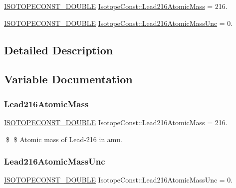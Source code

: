 \begin{DoxyCompactItemize}
\item 
\mbox{\hyperlink{group___isotope_const-_macros_ga8f45a7272ce02c0b4c65c44636ed719a}{I\+S\+O\+T\+O\+P\+E\+C\+O\+N\+S\+T\+\_\+\+D\+O\+U\+B\+LE}} \mbox{\hyperlink{group___isotope_const-_lead-_pb216_gab2c045657649e17697f279e77ea139ca}{Isotope\+Const\+::\+Lead216\+Atomic\+Mass}} = 216.
\item 
\mbox{\hyperlink{group___isotope_const-_macros_ga8f45a7272ce02c0b4c65c44636ed719a}{I\+S\+O\+T\+O\+P\+E\+C\+O\+N\+S\+T\+\_\+\+D\+O\+U\+B\+LE}} \mbox{\hyperlink{group___isotope_const-_lead-_pb216_ga7cbf75aa43ce0dad4aaaaf8ec94de4d6}{Isotope\+Const\+::\+Lead216\+Atomic\+Mass\+Unc}} = 0.
\end{DoxyCompactItemize}


\subsection{Detailed Description}


\subsection{Variable Documentation}
\mbox{\label{group___isotope_const-_lead-_pb216_gab2c045657649e17697f279e77ea139ca}} 
\subsubsection{\texorpdfstring{Lead216\+Atomic\+Mass}{Lead216AtomicMass}}
{\footnotesize\ttfamily \mbox{\hyperlink{group___isotope_const-_macros_ga8f45a7272ce02c0b4c65c44636ed719a}{I\+S\+O\+T\+O\+P\+E\+C\+O\+N\+S\+T\+\_\+\+D\+O\+U\+B\+LE}} Isotope\+Const\+::\+Lead216\+Atomic\+Mass = 216.}

\$ \$ Atomic mass of Lead-\/216 in amu. \mbox{\label{group___isotope_const-_lead-_pb216_ga7cbf75aa43ce0dad4aaaaf8ec94de4d6}} 
\subsubsection{\texorpdfstring{Lead216\+Atomic\+Mass\+Unc}{Lead216AtomicMassUnc}}
{\footnotesize\ttfamily \mbox{\hyperlink{group___isotope_const-_macros_ga8f45a7272ce02c0b4c65c44636ed719a}{I\+S\+O\+T\+O\+P\+E\+C\+O\+N\+S\+T\+\_\+\+D\+O\+U\+B\+LE}} Isotope\+Const\+::\+Lead216\+Atomic\+Mass\+Unc = 0.}

